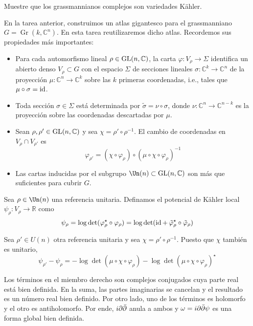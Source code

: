 \begin{problem}
Muestre que los grassmannianos complejos son variedades Kähler.
\end{problem}

\begin{solution}
En la tarea anterior, construimos un atlas gigantesco para el grassmanniano $G = \operatorname{Gr}(k, \mathbb C^n)$. En esta tarea reutilizaremos dicho atlas. Recordemos sus propiedades más importantes:

\begin{itemize}
    \item Para cada automorfismo lineal $\rho \in \operatorname{GL}(n, \mathbb C)$, la carta $\varphi : V_\rho \to \Sigma$ identifica un abierto denso $V_\rho \subset G$ con el espacio $\Sigma$ de secciones lineales $\sigma : \mathbb C^k \to \mathbb C^n$ de la proyección $\mu : \mathbb C^n \to \mathbb C^k$ sobre las $k$ primeras coordenadas, i.e., tales que $\mu \circ \sigma = \operatorname{id}$.
    
    \item Toda sección $\sigma \in \Sigma$ está determinada por $\tilde \sigma = \nu \circ \sigma$, donde $\nu : \mathbb C^n \to \mathbb C^{n-k}$ es la proyección sobre las coordenadas descartadas por $\mu$.
    
    \item Sean $\rho, \rho' \in \operatorname{GL}(n, \mathbb C)$ y sea $\chi = \rho' \circ \rho^{-1}$. El cambio de coordenadas en $V_\rho \cap V_{\rho'}$ es
    $$\varphi_{\rho'} = (\chi \circ \varphi_\rho) \circ (\mu \circ \chi \circ \varphi_\rho)^{-1}$$
    
    \item Las cartas inducidas por el subgrupo $\Un(n) \subset \GL(n, \mathbb C)$ son más que suficientes para cubrir $G$.
\end{itemize}

Sea $\rho \in \Un(n)$ una referencia unitaria. Definamos el potencial de Kähler local $\psi_\rho : V_\rho \to \mathbb R$ como
$$\psi_\rho = \log \det (\varphi_\rho^\star \circ \varphi_\rho) = \log \det (\operatorname{id} + \, \tilde \varphi_\rho^\star \circ \tilde \varphi_\rho)$$

Sea $\rho' \in U(n)$ otra referencia unitaria y sea $\chi = \rho' \circ \rho^{-1}$. Puesto que $\chi$ también es unitario,
$$\psi_{\rho'} - \psi_\rho = -\log \det (\mu \circ \chi \circ \varphi_\rho) - \log \det (\mu \circ \chi \circ \varphi_\rho)^\star$$

Los términos en el miembro derecho son complejos conjugados cuya parte real está bien definida. En la suma, las partes imaginarias se cancelan y el resultado es un número real bien definido. Por otro lado, uno de los términos es holomorfo y el otro es antiholomorfo. Por ende, $i \partial \bar \partial$ anula a ambos y $\omega = i \partial \bar \partial \psi$ es una forma global bien definida.


\end{solution}
